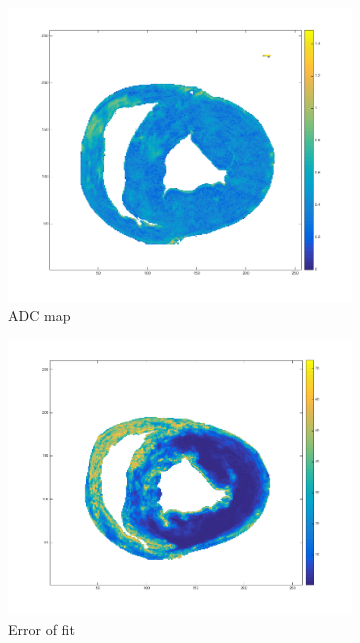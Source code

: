 \begin{figure}[h!]
    \begin{subfigure}{.31\textwidth}
        \includegraphics[width=\textwidth]{figures/pig4_adc_21}
        \caption{ADC map}
        \label{fig:pig4_adc}
    \end{subfigure}
    \begin{subfigure}{.31\textwidth}
        \includegraphics[width=\textwidth]{figures/pig4_err_21}
        \caption{Error of fit}
        \label{fig:pig4_err}
    \end{subfigure}
    \begin{subfigure}{.31\textwidth}

\end{subfigure}
\end{figure}
